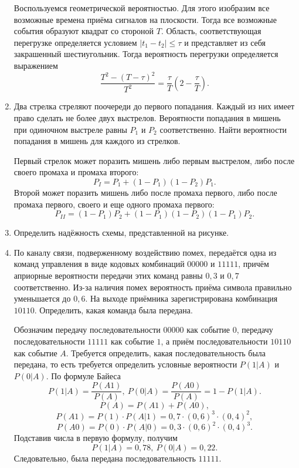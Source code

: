 \begin{enumerate}
        Воспользуемся геометрической вероятностью. Для этого изобразим все
        возможные времена приёма сигналов на плоскости. Тогда все возможные
        события образуют квадрат со стороной \( T \). Область, соответствующая
        перегрузке определяется условием \( |t_1 - t_2| \le \tau \) и
        представляет из себя закрашенный шестиугольник. Тогда вероятность
        перегрузки определяется выражением
        \[
            \frac{T^2 - (T-\tau)^2}{T^2} =
            \frac{\tau}{T}\left(2 - \frac{\tau}{T}\right).
        \]

    \item Два стрелка стреляют поочереди до первого попадания. Каждый из них
        имеет право сделать не более двух выстрелов. Вероятности попадания в
        мишень при одиночном выстреле равны \( P_1 \) и \( P_2 \)
        соответственно. Найти вероятности попадания в мишень для каждого из
        стрелков.

        Первый стрелок может поразить мишень либо первым выстрелом, либо после
        своего промаха и промаха второго:
        \[
            P_I = P_1 + (1 - P_1)(1 - P_2)P_1.
        \]
        Второй может поразить мишень либо после промаха первого, либо после
        промаха первого, своего и еще одного промаха первого:
        \[
            P_{II} = (1 - P_1) P_2 + (1 - P_1)(1 - P_2)(1 - P_1)P_2.
        \]
    \item Определить надёжность схемы, представленной на рисунке.
    \item По каналу связи, подверженному воздействию помех, передаётся одна из
        команд управления в виде кодовых комбинаций \( 00000 \) и \( 11111 \),
        причём априорные вероятности передачи этих команд равны \( 0,3 \) и
        \( 0,7 \) соответственно. Из-за наличия помех вероятность приёма символа
        правильно уменьшается до \( 0,6 \). На выходе приёмника зарегистрирована
        комбинация \( 10110 \). Определить, какая команда была передана.

        Обозначим передачу последовательности \( 00000 \) как событие \( 0 \),
        передачу последовательности \( 11111 \) как событие \( 1 \), а приём
        последовательности \( 10110 \) как событие \( A \). Требуется
        определить, какая последовательность была передана, то есть требуется
        определить условные вероятности \( P(1|A) \) и \( P(0|A) \). По формуле
        Байеса
        \[
            P(1|A) = \frac{P(A1)}{P(A)},\ P(0|A) = \frac{P(A0)}{P(A)} =
            1 - P(1|A).
        \]
        \[
            P(A) = P(A1) + P(A0),
        \]
        \[
            P(A1) = P(1) \cdot P(A|1) = 0,7\cdot(0,6)^3\cdot(0,4)^2,
        \]
        \[
            P(A0) = P(0) \cdot P(A|0) = 0,3\cdot(0,6)^2\cdot(0,4)^3.
        \]
        Подставив числа в первую формулу, получим
        \[
            P(1|A) = 0,78,\ P(0|A) = 0,22.
        \]
        Следовательно, была передана последовательность \( 11111 \).


\end{enumerate}
